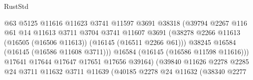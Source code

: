 \begin{lexlean}{RustStd}
\begin{coremodule}
                                            @63
                                            @5125
                                            @11616
                                            @11623
                                            @3741
                                            @11597
                                            @3691
                                            @38318
                                            (@39794
                                              @2267
                                              @116
                                              @61
                                              @14
                                              @11613
                                              @3711
                                              @3704
                                              @3741
                                              @11607
                                              @3691
                                              (@38278
                                                @2266
                                                @11613
                                                (@16505 (@16506 @11613))
                                                (@16145 (@16511 @2266 @61)))
                                              @38245
                                              @16584
                                              (@16145 (@16586 @11608 @3711)))
                                            @16584
                                            (@16145 (@16586 @11598 @11616)))
                                          @17641
                                          @17644
                                          @17647
                                          @17651
                                          @17656
                                          @39164)
                                        (@39840
                                          @11626
                                          @2278
                                          @2285
                                          @24
                                          @3711
                                          @11632
                                          @3711
                                          @11639
                                          (@40185
                                            @2278
                                            @24
                                            @11632
                                            (@38340
                                              @2277

\end{coremodule}
\end{lexlean}
